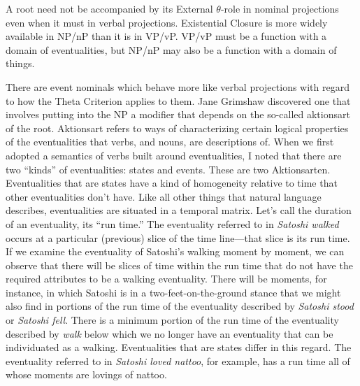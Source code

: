 \begin{exe}
	\raggedright
	\ex \label{ex5:diff} 
	\begin{xlist}
		\ex A root need not be accompanied by its External $\theta$-role in nominal projections even when it must in verbal projections.
		\ex Existential Closure is more widely available in NP/nP than it is in VP/vP.
		\ex VP/vP must be a function with a domain of eventualities, but NP/nP may also be a function with a domain of things.
	\end{xlist}
\end{exe}

There are event nominals which behave more like verbal projections with regard to how the Theta Criterion applies to them. Jane Grimshaw\cite{Grimshaw:1990b} discovered one that involves putting into the NP a modifier that depends on the so-called aktionsart of the root. Aktionsart refers to ways of characterizing certain logical properties of the eventualities that verbs, and nouns, are descriptions of. When we first adopted a semantics of verbs built around eventualities, I noted that there are two ``kinds'' of eventualities: states and events. These are two Aktionsarten. Eventualities that are states have a kind of homogeneity relative to time that other eventualities don't have. Like all other things that natural language describes, eventualities are situated in a temporal matrix. Let's call the duration of an eventuality, its ``run time.'' The eventuality referred to in \emph{Satoshi walked} occurs at a particular (previous) slice of the time line---that slice is its run time.%
%
%
%
 If we examine the eventuality of Satoshi's walking moment by moment, we can observe that there will be slices of time within the run time that do not have the required attributes to be a walking eventuality. There will be moments, for instance, in which Satoshi is in a two-feet-on-the-ground stance that we might also find in portions of the run time of the eventuality described by \emph{Satoshi stood} or \emph{Satoshi fell}. There is a minimum portion of the run time of the eventuality described by \emph{walk} below which we no longer have an eventuality that can be individuated as a walking. Eventualities that are states differ in this regard. The eventuality referred to in \emph{Satoshi loved nattoo}, for example, has a run time all of whose moments are lovings of nattoo.%
